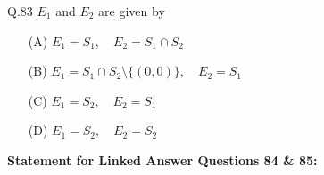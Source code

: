 \documentclass{article}
\begin{document}
																																																																																																																															  Q.83 \quad $E_1$ and $E_2$ are given by  
																																																																																																																															  \begin{itemize}
																																																																																																																															      \item[(A)] $E_1 = S_1,\quad E_2 = S_1 \cap S_2$
																																																																																																																															          \item[(B)] $E_1 = S_1 \cap S_2 \setminus \{(0,0)\},\quad E_2 = S_1$
																																																																																																																																      \item[(C)] $E_1 = S_2,\quad E_2 = S_1$
																																																																																																																																          \item[(D)] $E_1 = S_2,\quad E_2 = S_2$
																																																																																																																																	  \end{itemize}

																																																																																																																																	  \bigskip

																																																																																																																																	  \textbf{Statement for Linked Answer Questions 84 \& 85:}
\end{document}

